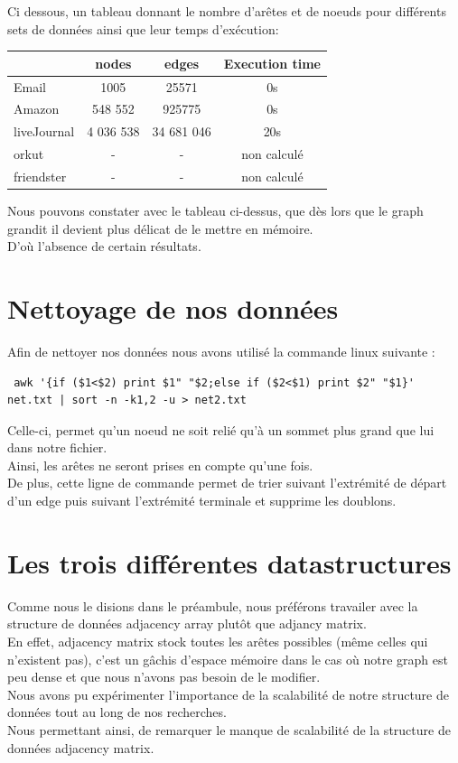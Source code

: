 \documentclass[a4paper,10pt]{report}
\begin{document}
Ci dessous, un tableau donnant le nombre d'arêtes et de noeuds pour différents sets de données ainsi que leur temps d'exécution:
\\

\begin{center}
    \begin{tabular}{|l|c|c|c|}
    \hline
     & nodes & edges & Execution time \\ \hline
     Email & 1005 & 25571 & 0s \\
     Amazon & 548 552 & 925775 & 0s\\
     liveJournal & 4 036 538 & 34 681 046 & 20s\\
     orkut & - & - & non calculé \\
     friendster & - & - & non calculé\\
     \hline
    \end{tabular}
\end{center}
Nous pouvons constater avec le tableau ci-dessus, que dès lors que le graph grandit il devient plus délicat de le mettre en mémoire. \\ 
D'où l'absence de certain résultats.
\\
\section{Nettoyage de nos données}
Afin de nettoyer nos données nous avons utilisé la commande linux suivante :
\begin{lstlisting}
 awk '{if ($1<$2) print $1" "$2;else if ($2<$1) print $2" "$1}' net.txt | sort -n -k1,2 -u > net2.txt
\end{lstlisting}
Celle-ci, permet qu'un noeud ne soit relié qu'à un sommet plus grand que lui dans notre fichier. 
\\
Ainsi, les arêtes ne seront prises en compte qu'une fois. 
\\ 
De plus, cette ligne de commande permet de trier suivant l'extrémité de départ d'un edge puis suivant l'extrémité terminale et supprime les doublons.
\\
\section{Les trois différentes datastructures}
Comme nous le disions dans le préambule, nous préférons travailer avec la structure de données adjacency array plutôt que adjancy matrix. 
\\
\newline
En effet, adjacency matrix stock toutes les arêtes possibles (même celles qui n'existent pas), c'est un gâchis d'espace mémoire dans le cas où notre graph est peu dense et que nous n'avons pas besoin de le modifier.
\\
Nous avons pu expérimenter l'importance de la scalabilité de notre structure de données tout au long de nos recherches.
\\
\newline
Nous permettant ainsi, de remarquer le manque de scalabilité de la structure de données adjacency matrix.
\\
\end{document}
